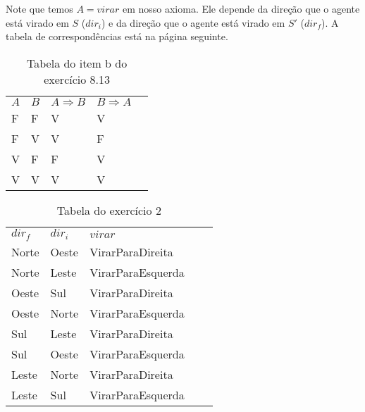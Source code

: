 \documentclass[12pt,letterpaper]{article}
\begin{document}
	Note que temos $A = virar$ em nosso axioma. Ele depende da direção que o agente está virado em $S$ ($dir_i$) e da direção que o agente está virado em $S'$ ($dir_f$). A tabela de correspondências está na página seguinte.
	
	
	
	
	
	\newpage 
	
	\begin{table}[]
		\centering
		\caption{Tabela do item b do exercício 8.13}
		\label{my-label}
		\begin{tabular}{|l|l|l|l|l}
			\cline{1-4}
			$A$ & $B$ & $A \Rightarrow B$ & $B \Rightarrow A$ &  \\ \cline{1-4}
			F   & F   & V                 & V                 &  \\ \cline{1-4}
			F   & V   & V                 & F                 &  \\ \cline{1-4}
			V   & F   & F                 & V                 &  \\ \cline{1-4}
			V   & V   & V                 & V                 &  \\ \cline{1-4}
		\end{tabular}
	\end{table}
	
	\begin{table}[]
		\centering
		\caption{Tabela do exercício 2}
		\label{my-label}
		\begin{tabular}{|l|l|l|ll}
			\cline{1-3}
			$dir_f$ & $dir_i$ & $virar$             &  &  \\ \cline{1-3}
			Norte   & Oeste   & VirarParaDireita    &  &  \\ \cline{1-3}
			Norte   & Leste   & VirarParaEsquerda   &  &  \\ \cline{1-3}
		    Oeste   & Sul     & VirarParaDireita    &  &  \\ \cline{1-3}
			Oeste   & Norte   & VirarParaEsquerda   &  &  \\ \cline{1-3}
			Sul     & Leste   & VirarParaDireita    &  &  \\ \cline{1-3}
			Sul     & Oeste   & VirarParaEsquerda   &  &  \\ \cline{1-3}
			Leste   & Norte   & VirarParaDireita    &  &  \\ \cline{1-3}
			Leste   & Sul     & VirarParaEsquerda   &  &  \\ \cline{1-3}
		\end{tabular}
	\end{table}
			 
\end{document}
